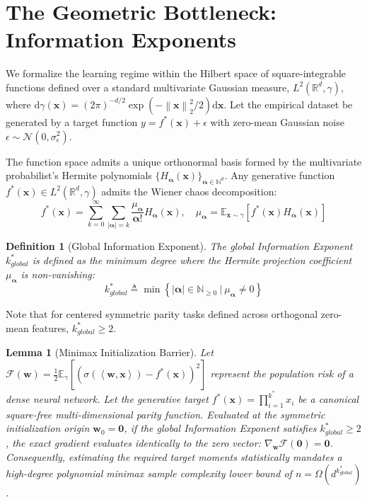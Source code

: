 \documentclass{article}
\newcommand{\E}{\mathbb{E}}
\newcommand{\R}{\mathbb{R}}
\newcommand{\N}{\mathbb{N}}
\newcommand{\1}{\mathbb{I}}
\newcommand{\diff}{\mathrm{d}}
\newcommand{\norm}[1]{\left\lVert#1\right\rVert}
\newcommand{\inner}[2]{\left\langle#1, #2\right\rangle}
\newcommand{\calF}{\mathcal{F}}
\newcommand{\bx}{\mathbf{x}}
\newcommand{\bw}{\mathbf{w}}
\newcommand{\balpha}{\boldsymbol{\alpha}}
\newcommand{\calN}{\mathcal{N}}
\newtheorem{lemma}[theorem]{Lemma}
\newtheorem{definition}[theorem]{Definition}
\begin{document}
\section{The Geometric Bottleneck: Information Exponents}
\label{sec:functional}

We formalize the learning regime within the Hilbert space of square-integrable functions defined over a standard multivariate Gaussian measure, $L^2(\R^d, \gamma)$, where $\diff\gamma(\bx) = (2\pi)^{-d/2} \exp(-\norm{\bx}_2^2/2) \diff\bx$. Let the empirical dataset be generated by a target function $y = f^*(\bx) + \epsilon$ with zero-mean Gaussian noise $\epsilon \sim \calN(0, \sigma_\epsilon^2)$.

The function space admits a unique orthonormal basis formed by the multivariate probabilist's Hermite polynomials $\{H_{\balpha}(\bx)\}_{\balpha \in \N^d}$. Any generative function $f^*(\bx) \in L^2(\R^d, \gamma)$ admits the Wiener chaos decomposition:
\begin{equation} \label{eq:hermite_expansion}
    f^*(\bx) = \sum_{k=0}^{\infty} \sum_{|\balpha|=k} \frac{\mu_{\balpha}}{\balpha!} H_{\balpha}(\bx), \quad \mu_{\balpha} = \E_{\bx \sim \gamma}[f^*(\bx) H_{\balpha}(\bx)]
\end{equation}

\begin{definition}[Global Information Exponent] \label{def:global_exponent}
The global Information Exponent $k_{global}^*$ is defined as the minimum degree where the Hermite projection coefficient $\mu_{\balpha}$ is non-vanishing:
\begin{equation}
    k_{global}^* \triangleq \min \left\{ |\balpha| \in \N_{\ge 0} \ \Big| \ \mu_{\balpha} \neq 0 \right\}
\end{equation}
\end{definition}
Note that for centered symmetric parity tasks defined across orthogonal zero-mean features, $k_{global}^* \ge 2$.

\begin{lemma}[Minimax Initialization Barrier] \label{lem:vanishing}
Let $\calF(\bw) = \frac{1}{2} \E_\gamma[(\sigma(\inner{\bw}{\bx}) - f^*(\bx))^2]$ represent the population risk of a dense neural network. Let the generative target $f^*(\bx) = \prod_{i=1}^{k^*} x_i$ be a canonical square-free multi-dimensional parity function. Evaluated at the symmetric initialization origin $\bw_0 = \mathbf{0}$, if the global Information Exponent satisfies $k_{global}^* \ge 2$, the exact gradient evaluates identically to the zero vector: $\nabla_\bw \calF(\mathbf{0}) = \mathbf{0}$. Consequently, estimating the required target moments statistically mandates a high-degree polynomial minimax sample complexity lower bound of $n = \Omega(d^{k_{global}^*})$.
\end{lemma}
\end{document}

